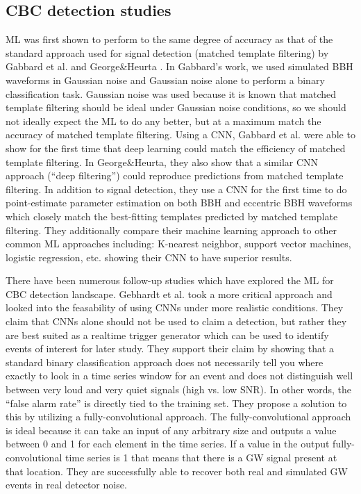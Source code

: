 %
%
\subsection{CBC detection studies}

\ac{ML} was first shown to perform to the same degree of accuracy as that of the standard approach used for signal detection (matched template filtering) by Gabbard et al. \cite{PhysRevLett.120.141103} and George\&Heurta \cite{PhysRevD.97.044039}. In Gabbard's work, we used simulated \ac{BBH} waveforms in Gaussian noise and Gaussian noise alone to perform a binary classification task. Gaussian noise was used because it is known that matched template filtering should be ideal under Gaussian noise conditions, so we should not ideally expect the \ac{ML} to do any better, but at a maximum match the accuracy of matched template filtering. Using a \ac{CNN}, Gabbard et al. were able to show for the first time that deep learning could match the efficiency of matched template filtering. In George\&Heurta, they also show that a similar \ac{CNN} approach (``deep filtering'') could reproduce predictions from matched template filtering. In addition to signal detection, they use a \ac{CNN} for the first time to do point-estimate parameter estimation on both \ac{BBH} and eccentric \ac{BBH} waveforms which closely match the best-fitting templates predicted by matched template filtering. They additionally compare their machine learning approach to other common \ac{ML} approaches including: K-nearest neighbor, support vector machines, logistic regression, etc. showing their \ac{CNN} to have superior results.


%
%
There have been numerous follow-up studies which have explored the \ac{ML} for \ac{CBC} detection landscape. Gebhardt et al. took a more critical approach and looked into the feasability of using \ac{CNN}s under more realistic conditions. They claim that \ac{CNN}s alone should not be used to claim a detection, but rather they are best suited as a realtime trigger generator which can be used to identify events of interest for later study. They support their claim by showing that a standard binary classification approach does not necessarily tell you where exactly to look in a time series window for an event and does not distinguish well between very loud and very quiet signals (high vs. low \ac{SNR}). In other words, the ``false alarm rate'' is directly tied to the training set. They propose a solution to this by utilizing a fully-convolutional approach. The fully-convolutional approach is ideal because it can take an input of any arbitrary size and outputs a value between 0 and 1 for each element in the time series. If a value in the output fully-convolutional time series is 1 that means that there is a \ac{GW} signal present at that location. They are successfully able to recover both real and simulated \ac{GW} events in real detector noise. 

